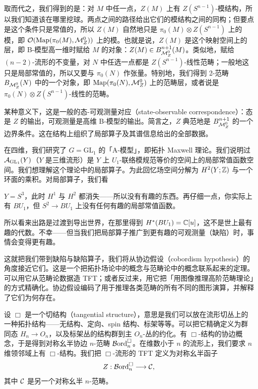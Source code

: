 取而代之，我们得到的是：对 $M$ 中任一点，$Z(M)$ 上有 $Z(S^{n-1})$-模结构，所以我们知道该在哪里挖球。两点之间的路径给出它们的模结构之间的同构；但要点是这个条件只是常值的，所以 $Z(M)$ 自然地只是 $\pi_0(M)\otimes Z(S^{n-1})$ 上的模，即 $\mathcal{O}(\operatorname{Map}(\pi_0(M),\mathcal{M}^0_Z))$ 上的模。也就是说，$Z(M)$ 是这个映射空间上的层，即 B-模型高一维时赋给 $M$ 的对象：$Z(M)\in B^{n+1}_{\mathcal{M}^0_Z}(M)$。类似地，赋给 $(n-2)$-流形的不变量，对 $N$ 中任选一点都是 $Z(S^{n-1})$-线性范畴；一般地这只是局部常值的，所以又要与 $\pi_0(N)$ 作张量。特别地，我们得到 2-范畴 $B_{\mathcal{M}^0_Z}(N)$ 中的一个对象，即 $\operatorname{Map}(\pi_0(N),\mathcal{M}^0_Z)$ 上的范畴层，或者说是 $\pi_0(N)\otimes Z(S^{n-1})$-线性的范畴。

某种意义下，这是一般的态-可观测量对应（state-observable correspondence）：态是 $Z$ 的输出，可观测量是高维 B-模型的输出。简言之，$Z$ 典范地是 $B^{n+1}_{\mathcal{M}^0_Z}$ 的一个边界条件。这在结构上组织了局部算子及其谱信息给出的全部数据。

在四维，我们研究了 $G=\mathrm{GL}_1$ 的「A-模型」，即拓扑 Maxwell 理论。我们说明过 $\mathcal{A}_{\mathrm{GL}_1}(Y)$（$Y$ 是三维流形）是 $Y$ 上 $U_1$-联络模规范等价的空间上的局部常值函数空间。我们想理解这个理论中的局部算子。为此回忆场空间分解为 $H^2(Y;\mathbb{Z})$ 与一个环面的乘积。对局部算子，我们看


$Y=S^3$，此时 $H^1$ 与 $H^2$ 都消失——所以没有有趣的东西。再仔细一点，你实际上有 $BU_1$，但 $S^2\to BU_1$ 上没有任何有趣的局部常值函数。

所以看来出路是过渡到导出世界，在那里得到 $H^*(BU_1)=\mathbb{C}[u]$，这不是世上最有趣的代数。不幸——但当我们把局部算子推广到更有趣的可观测量（缺陷）时，事情会变得更有趣。

这就把我们带到缺陷与缺陷算子，我们将从协边假设（cobordism hypothesis）的角度接近它们。这是一个把拓扑场论中的概念与范畴论中的概念联系起来的定理。可以用它从范畴论数据造 TFT；或者反过来，用它把「用图像推理高阶范畴理论」的方式精确化。协边假设编码了用于推理各类范畴的所有不同的图形演算，并解释了它们为何存在。

设 $\Box$ 是一个切结构（tangential structure），意思是我们可以放在流形切丛上的一种拓扑结构——无结构、定向、spin 结构、标架等等。可以把它精确定义为群同态 $H_n\to O_n$，以及标架丛的结构群到主 $O_n$-丛的约化。有 $\Box$-结构的协边概念，于是得到对称幺半协边 $n$-范畴 $\mathcal{B}\mathrm{ord}^{\Box}_n$。在维数小于 $n$ 的流形上，我们要求 $n$ 维领邻域上有 $\Box$-结构。我们把 $\Box$-流形的 TFT 定义为对称幺半函子
\[
Z:\mathcal{B}\mathrm{ord}^{\Box}_n\longrightarrow\mathcal{C},
\]
其中 $\mathcal{C}$ 是另一个对称幺半 $n$-范畴。

